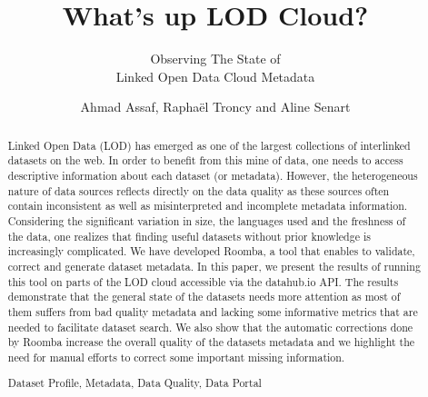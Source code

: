 \documentclass[runningheads,a4paper]{../../Tools/LaTEX/llncs}
\newcommand{\keywords}[1]{\par\addvspace\baselineskip
\noindent\keywordname\enspace\ignorespaces#1}
\begin{document}
\title{What's up LOD Cloud?}
\subtitle{Observing The State of\\Linked Open Data Cloud Metadata}

\author{Ahmad Assaf, Rapha\"{e}l Troncy and Aline Senart}



\maketitle


\begin{abstract}
Linked Open Data (LOD) has emerged as one of the largest collections of interlinked datasets on the web. In order to benefit from this mine of data, one needs to access descriptive information about each dataset (or metadata). However, the heterogeneous nature of data sources reflects directly on the data quality as these sources often contain inconsistent as well as misinterpreted and incomplete metadata information. Considering the significant variation in size, the languages used and the freshness of the data, one realizes that finding useful datasets without prior knowledge is increasingly complicated. We have developed Roomba, a tool that enables to validate, correct and generate dataset metadata. In this paper, we present the results of running this tool on parts of the LOD cloud accessible via the datahub.io API. The results demonstrate that the general state of the datasets needs more attention as most of them suffers from bad quality metadata and lacking some informative metrics that are needed to facilitate dataset search. We also show that the automatic corrections done by Roomba increase the overall quality of the datasets metadata and we highlight the need for manual efforts to correct some important missing information.

\keywords{Dataset Profile, Metadata, Data Quality, Data Portal}
\end{abstract}

\end{document}

